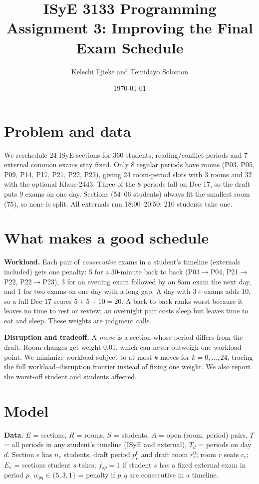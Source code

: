 \documentclass[11pt]{article}
\title{ISyE 3133 Programming Assignment 3: Improving the Final Exam Schedule}
\author{Kelechi Ejieke and Temidayo Solomon}
\date{\today}
\begin{document}
\maketitle
\vspace{-2.2em}

\section{Problem and data}
We reschedule 24 ISyE sections for 360 students; reading/conflict periods and 7 external common exams stay fixed. Only 8 regular periods have rooms (P03, P05, P09, P14, P17, P21, P22, P23), giving 24 room-period slots with 3 rooms and 32 with the optional Klaus-2443. Three of the 8 periods fall on Dec 17, so the draft puts 9 exams on one day. Sections (54--66 students) always fit the smallest room (75), so none is split. All externals run 18:00--20:50; 210 students take one.

\section{What makes a good schedule}
\textbf{Workload.} Each pair of \emph{consecutive} exams in a student's timeline (externals included) gets one penalty: 5 for a 30-minute back to back (P03$\to$P04, P21$\to$P22, P22$\to$P23), 3 for an evening exam followed by an 8am exam the next day, and 1 for two exams on one day with a long gap. A day with 3+ exams adds 10, so a full Dec 17 scores $5+5+10=20$. A back to back ranks worst because it leaves no time to rest or review; an overnight pair costs sleep but leaves time to eat and sleep. These weights are judgment calls.

\textbf{Disruption and tradeoff.} A \emph{move} is a section whose period differs from the draft. Room changes get weight 0.01, which can never outweigh one workload point. We minimize workload subject to at most $k$ moves for $k=0,\dots,24$, tracing the full workload--disruption frontier instead of fixing one weight. We also report the worst-off student and students affected.

\section{Model}
\textbf{Data.} $E$ = sections, $R$ = rooms, $S$ = students, $A$ = open (room, period) pairs, $T$ = all periods in any student's timeline (ISyE and external), $T_d$ = periods on day $d$. Section $e$ has $n_e$ students, draft period $p^0_e$ and draft room $r^0_e$; room $r$ seats $c_r$; $E_s$ = sections student $s$ takes; $f_{sp}=1$ if student $s$ has a fixed external exam in period $p$. $w_{pq} \in \{5,3,1\}$ = penalty if $p,q$ are consecutive in a timeline.
\end{document}
